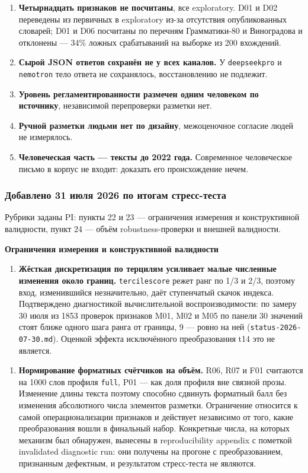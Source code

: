 \documentclass[11pt,a4paper]{article}
\renewcommand{\_}{\textunderscore\allowbreak}
\begin{document}
\begin{enumerate}
\item[17.] \textbf{Четырнадцать признаков не посчитаны}, все exploratory. D01 и D02 переведены из первичных в exploratory из-за отсутствия опубликованных словарей; D01 и D06 посчитаны по перечням Грамматики-80 и Виноградова и отклонены — 34\% ложных срабатываний на выборке из 200 вхождений.
\item[18.] \textbf{Сырой JSON ответов сохранён не у всех каналов.} У \texttt{deepseek\_pro} и \texttt{nemotron} тело ответа не сохранялось, восстановлению не подлежит.
\item[19.] \textbf{Уровень регламентированности размечен одним человеком по источнику}, независимой перепроверки разметки нет.
\item[20.] \textbf{Ручной разметки людьми нет по дизайну}, межоценочное согласие людей не измерялось.
\item[21.] \textbf{Человеческая часть — тексты до 2022 года.} Современное человеческое письмо в корпус не входит: доказать его происхождение нечем.
\end{enumerate}

\subsubsection{Добавлено 31 июля 2026 по итогам стресс-теста}

Рубрики заданы PI: пункты 22 и 23 — ограничения измерения и конструктивной валидности, пункт 24 — объём robustness-проверки и внешней валидности.

\textbf{Ограничения измерения и конструктивной валидности}

\begin{enumerate}
\item[22.] \textbf{Жёсткая дискретизация по терцилям усиливает малые численные изменения около границ.} \texttt{tercile\_score} режет ранг по 1/3 и 2/3, поэтому вход, изменившийся незначительно, даёт ступенчатый скачок индекса. Подтверждено диагностикой вычислительной воспроизводимости: по замеру 30 июля из 1853 проверок признаков M01, M02 и M05 по панели 30 значений стоят ближе одного шага ранга от границы, 9 — ровно на ней (\texttt{status-\allowbreak{}2026-\allowbreak{}07-\allowbreak{}30.md}). Оценкой эффекта исключённого преобразования t14 это не является.
\end{enumerate}

\begin{enumerate}
\item[23.] \textbf{Нормирование форматных счётчиков на объём.} R06, R07 и F01 считаются на 1000 слов профиля \texttt{full}, P01 — как доля профиля вне связной прозы. Изменение длины текста поэтому способно сдвинуть форматный балл без изменения абсолютного числа элементов разметки. Ограничение относится к самой операционализации признаков и действует независимо от того, какие преобразования вошли в финальный набор. Конкретные числа, на которых механизм был обнаружен, вынесены в reproducibility appendix с пометкой invalidated diagnostic run: они получены на прогоне с преобразованием, признанным дефектным, и результатом стресс-теста не являются.
\end{enumerate}
\end{document}
